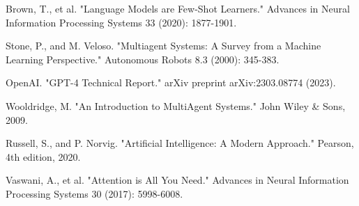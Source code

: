 \documentclass[conference]{IEEEtran}
\begin{document}
\begin{thebibliography}{00}
 Brown, T., et al. "Language Models are Few-Shot Learners." Advances in Neural Information Processing Systems 33 (2020): 1877-1901.

 Stone, P., and M. Veloso. "Multiagent Systems: A Survey from a Machine Learning Perspective." Autonomous Robots 8.3 (2000): 345-383.

 OpenAI. "GPT-4 Technical Report." arXiv preprint arXiv:2303.08774 (2023).

 Wooldridge, M. "An Introduction to MultiAgent Systems." John Wiley \& Sons, 2009.

 Russell, S., and P. Norvig. "Artificial Intelligence: A Modern Approach." Pearson, 4th edition, 2020.

 Vaswani, A., et al. "Attention is All You Need." Advances in Neural Information Processing Systems 30 (2017): 5998-6008.

\end{thebibliography}
\end{document}
